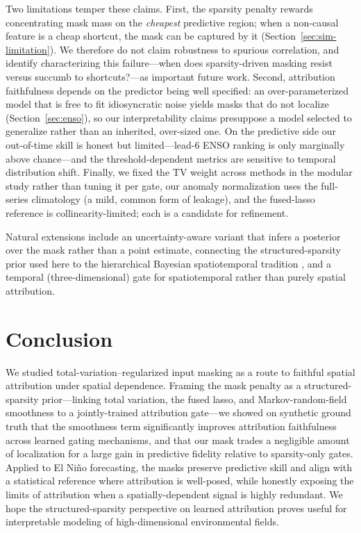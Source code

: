 \documentclass[12pt]{article}
\begin{document}
Two limitations temper these claims. First, the sparsity penalty rewards concentrating mask mass
on the \emph{cheapest} predictive region; when a non-causal feature is a cheap shortcut, the mask
can be captured by it (Section~\ref{sec:sim-limitation}). We therefore do not claim robustness to
spurious correlation, and identify characterizing this failure---when does sparsity-driven masking
resist versus succumb to shortcuts?---as important future work. Second, attribution faithfulness
depends on the predictor being well specified: an over-parameterized model that is free to fit
idiosyncratic noise yields masks that do not localize (Section~\ref{sec:enso}), so our
interpretability claims presuppose a model selected to generalize rather than an inherited,
over-sized one. On the predictive side our out-of-time skill is honest but limited---lead-6 ENSO
ranking is only marginally above chance---and the threshold-dependent metrics are sensitive to
temporal distribution shift. Finally, we fixed the TV weight across methods in the
modular study rather than tuning it per gate, our anomaly normalization uses the full-series
climatology (a mild, common form of leakage), and the fused-lasso reference is collinearity-limited;
each is a candidate for refinement.

Natural extensions include an uncertainty-aware variant that infers a posterior over the mask
rather than a point estimate, connecting the structured-sparsity prior used here to the
hierarchical Bayesian spatiotemporal tradition \citep{wikle2023statistical, zammit2020deep}, and a
temporal (three-dimensional) gate for spatiotemporal rather than purely spatial attribution.

\section{Conclusion}\label{sec-conclusion}
We studied total-variation--regularized input masking as a route to faithful spatial attribution
under spatial dependence. Framing the mask penalty as a structured-sparsity prior---linking total
variation, the fused lasso, and Markov-random-field smoothness to a jointly-trained attribution
gate---we showed on synthetic ground truth that the smoothness term significantly improves
attribution faithfulness across learned gating mechanisms, and that our mask trades a negligible
amount of localization for a large gain in predictive fidelity relative to sparsity-only gates.
Applied to El Ni\~no forecasting, the masks preserve predictive skill and align with a statistical
reference where attribution is well-posed, while honestly exposing the limits of attribution when
a spatially-dependent signal is highly redundant. We hope the structured-sparsity perspective on
learned attribution proves useful for interpretable modeling of high-dimensional environmental
fields.
\end{document}

